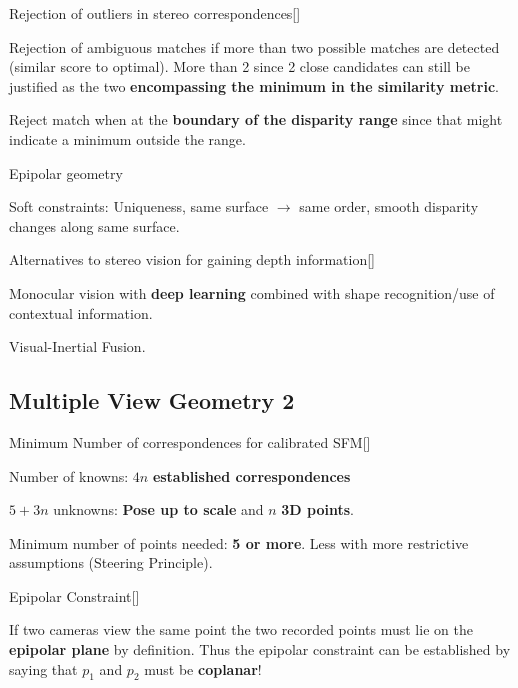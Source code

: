 \documentclass[10pt,a4paper]{scrartcl}
\begin{document}
\begin{multicols*}{2}
\begin{QandA}
{Rejection of outliers in stereo correspondences}[\Application]
\item Rejection of ambiguous matches if more than two possible matches are detected (similar score to optimal). More than 2 since 2 close candidates can still be justified as the two \textbf{encompassing the minimum in the similarity metric}.
\item Reject match when at the \textbf{boundary of the disparity range} since that might indicate a minimum outside the range.
\item Epipolar geometry
\item Soft constraints: Uniqueness, same surface $\rightarrow$ same order, smooth disparity changes along same surface.
\end{QandA}

\begin{QandA}
{Alternatives to stereo vision for gaining depth information}[\Comparison]
\item Monocular vision with \textbf{deep learning} combined with shape recognition/use of contextual information.
\item Visual-Inertial Fusion.
\end{QandA}

\subsection*{Multiple View Geometry 2}

\begin{QandA}
{Minimum Number of correspondences for calibrated SFM}[\Application]
\item Number of knowns: $4n$ \textbf{established correspondences}
\item $5 + 3n$ unknowns: \textbf{Pose up to scale} and $n$ \textbf{3D points}.
\item Minimum number of points needed: \textbf{5 or more}. Less with more restrictive assumptions (Steering Principle).
\end{QandA}

\begin{QandA}
{Epipolar Constraint}[\Derivation]
\item If two cameras view the same point the two recorded points must lie on the \textbf{epipolar plane} by definition. Thus the epipolar constraint can be established by saying that $p_1$ and $p_2$ must be \textbf{coplanar}!
\end{QandA}


\end{multicols*}
\end{document}
